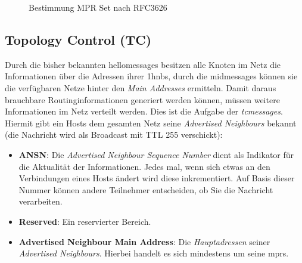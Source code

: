 \begin{figure}
  \caption{Bestimmung MPR Set nach RFC3626 \cite{RFC3626}}
  \label{chapter:routing:olsr:mpr:image}
\end{figure}

\subsection{Topology Control (TC)}
\label{chapter:routing:olsr:tc}

Durch die bisher bekannten \glspl{hellomessage} besitzen alle Knoten im Netz die Informationen über die Adressen ihrer \glspl{1hnb}, durch die \glspl{midmessage} können sie die verfügbaren Netze hinter den \textit{Main Addresses} ermitteln. Damit daraus brauchbare Routinginformationen generiert werden können, müssen weitere Informationen im Netz verteilt werden. Dies ist die Aufgabe der \textit{\glspl{tcmessage}}. Hiermit gibt ein Hosts dem gesamten Netz seine \textit{Advertised Neighbours} bekannt (die Nachricht wird als Broadcast mit TTL 255 verschickt): 

\begin{itemize}
\item \textbf{ANSN}: Die \textit{Advertised Neighbour Sequence Number} dient als Indikator für die Aktualität der Informationen. Jedes mal, wenn sich etwas an den Verbindungen eines Hosts ändert wird diese inkrementiert. Auf Basis dieser Nummer können andere Teilnehmer entscheiden, ob Sie die Nachricht verarbeiten.
\item \textbf{Reserved}: Ein reservierter Bereich.
\item \textbf{Advertised Neighbour Main Address}: Die \textit{Hauptadressen} seiner \textit{Advertised Neighbours}. Hierbei handelt es sich mindestens um seine \glspl{mpr}.
\end{itemize}


